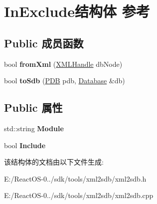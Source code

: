 \hypertarget{struct_in_exclude}{}\section{In\+Exclude结构体 参考}
\label{struct_in_exclude}
\subsection*{Public 成员函数}
\begin{DoxyCompactItemize}
\item 
\mbox{\label{struct_in_exclude_a9f0c4a4af8bab82d0bbe765f31249e23}} 
bool {\bfseries from\+Xml} (\hyperlink{classtinyxml2_1_1_x_m_l_handle}{X\+M\+L\+Handle} db\+Node)
\item 
\mbox{\label{struct_in_exclude_a7b43ca31f46d67eb02c8c6ff9e12edd1}} 
bool {\bfseries to\+Sdb} (\hyperlink{struct___d_b}{P\+DB} pdb, \hyperlink{struct_database}{Database} \&db)
\end{DoxyCompactItemize}
\subsection*{Public 属性}
\begin{DoxyCompactItemize}
\item 
\mbox{\label{struct_in_exclude_ab6ba7f7760f2ed12758e6bb9dbc79b53}} 
std\+::string {\bfseries Module}
\item 
\mbox{\label{struct_in_exclude_aba2ba8f07ddeac530af07981d01af030}} 
bool {\bfseries Include}
\end{DoxyCompactItemize}


该结构体的文档由以下文件生成\+:\begin{DoxyCompactItemize}
\item 
E\+:/\+React\+O\+S-\/0../sdk/tools/xml2sdb/xml2sdb.\+h\item 
E\+:/\+React\+O\+S-\/0../sdk/tools/xml2sdb/xml2sdb.\+cpp\end{DoxyCompactItemize}
